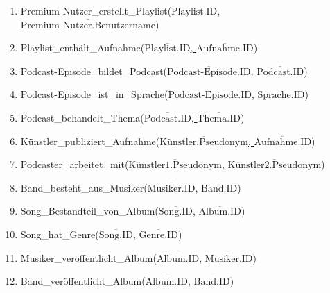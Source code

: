 \documentclass[a4paper,11pt]{article}
\begin{document}
\begin{enumerate}
    \item Premium-Nutzer\_erstellt\_Playlist(\underline{$\overline{\text{Playlist.ID}}$}, $\overline{\text{Premium-Nutzer.Benutzername}}$)
    \item Playlist\_enthält\_Aufnahme(\underline{$\overline{\text{Playlist.ID}}$, $\overline{\text{Aufnahme.ID}}$})
    \item Podcast-Episode\_bildet\_Podcast(\underline{$\overline{\text{Podcast-Episode.ID}}$}, $\overline{\text{Podcast.ID}}$)
    \item Podcast-Episode\_ist\_in\_Sprache(\underline{$\overline{\text{Podcast-Episode.ID}}$}, $\overline{\text{Sprache.ID}}$)
    \item Podcast\_behandelt\_Thema(\underline{$\overline{\text{Podcast.ID}}$, $\overline{\text{Thema.ID}}$})
    \item Künstler\_publiziert\_Aufnahme(\underline{$\overline{\text{Künstler.Pseudonym}}$, $\overline{\text{Aufnahme.ID}}$})
    \item Podcaster\_arbeitet\_mit(\underline{$\overline{\text{Künstler1.Pseudonym}}$, $\overline{\text{Künstler2.Pseudonym}}$})
    \item Band\_besteht\_aus\_Musiker(\underline{$\overline{\text{Musiker.ID}}$}, $\overline{\text{Band.ID}}$) 
    \item Song\_Bestandteil\_von\_Album(\underline{$\overline{\text{Song.ID}}$}, $\overline{\text{Album.ID}}$)
    \item Song\_hat\_Genre(\underline{$\overline{\text{Song.ID}}$}, $\overline{\text{Genre.ID}}$)
    \item Musiker\_veröffentlicht\_Album(\underline{$\overline{\text{Album.ID}}$}, $\overline{\text{Musiker.ID}}$)
    \item Band\_veröffentlicht\_Album(\underline{$\overline{\text{Album.ID}}$}, $\overline{\text{Band.ID}}$)

\end{enumerate}
\end{document}
